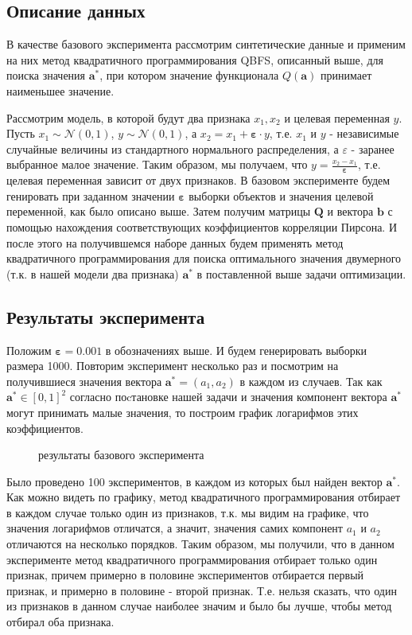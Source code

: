 \documentclass[12pt, twoside]{article}
\newcommand{\ba}{\mathbf{a}}
\newcommand{\bb}{\mathbf{b}}
\newcommand{\bQ}{\mathbf{Q}}
\newcommand{\beps}{\boldsymbol{\varepsilon}}
\newcommand{\cN}{\mathcal{N}}
\begin{document}
\subsection{Описание данных}

В качестве базового эксперимента рассмотрим синтетические данные и применим на них метод квадратичного программирования QBFS, описанный выше, для поиска значения $\ba^*$, при котором значение функционала $Q(\ba)$ принимает наименьшее значение.

Рассмотрим модель, в которой будут два признака $x_1, x_2$ и целевая переменная $y$. Пусть $x_1 \sim \cN(0, 1)$, $y \sim \cN(0, 1)$, а $x_2 = x_1 + \beps \cdot y$, т.е. $x_1$ и $y$ - независимые случайные величины из стандартного нормального распределения, а $\varepsilon$ - заранее выбранное малое значение. Таким образом, мы получаем, что $y = \frac{x_2 - x_1}{\beps}$, т.е. целевая переменная зависит от двух признаков. В базовом эксперименте будем генировать при заданном значении $\beps$ выборки объектов и значения целевой переменной, как было описано выше.  Затем получим матрицы $\bQ$ и вектора $\bb$ с помощью нахождения соответствующих коэффициентов корреляции Пирсона. И после этого на получившемся наборе данных будем применять метод квадратичного программирования для поиска оптимального значения двумерного (т.к. в нашей модели два признака) $\ba^*$ в поставленной выше задачи оптимизации.

\subsection{Результаты эксперимента}

Положим $\beps = 0.001$ в обозначениях выше. И будем генерировать выборки размера 1000. Повторим эксперимент несколько раз и посмотрим на получившиеся значения вектора $\ba^* = (a_1, a_2)$ в каждом из случаев. Так как $\ba^* \in [0, 1]^2$ согласно поcтановке нашей задачи и значения компонент вектора $\ba^*$ могут принимать малые значения, то построим график логарифмов этих коэффициентов. 

\begin{figure}[htb]
\caption{результаты базового эксперимента}
\label{fig:image, d11_lower_pic}
\end{figure}


Было проведено 100 экспериментов, в каждом из которых был найден вектор $\ba^*$. Как можно видеть по графику, метод квадратичного программирования отбирает в каждом случае только один из признаков, т.к. мы видим на графике, что значения логарифмов отличатся, а значит, значения самих компонент $a_1$ и $a_2$ отличаются на несколько порядков. Таким образом, мы получили, что в данном эксперименте метод квадратичного программирования отбирает только один признак, причем примерно в половине экспериментов отбирается первый признак, и примерно в половине - второй признак. Т.е. нельзя сказать, что один из признаков в данном случае наиболее значим и было бы лучше, чтобы метод отбирал оба признака.
\end{document}
